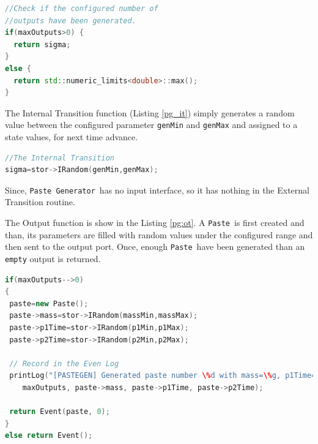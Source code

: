 \documentclass[titlepage]{report}%
\newcommand{\pgen}{\texttt{Paste Generator}~}
\newcommand{\paste}{\texttt{Paste}~}
\begin{document}
{\begin{lstlisting}[caption={The TA (Time Advance) function}, language=c++, label={pg_ta}]
//Check if the configured number of
//outputs have been generated.
if(maxOutputs>0) {
  return sigma;
}
else {
  return std::numeric_limits<double>::max();
}
\end{lstlisting}	

The Internal Transition function (Listing \ref{pg_it}) simply generates a random value between the configured parameter \texttt{genMin} and \texttt{genMax} and assigned to a state values, for next time advance.

\begin{lstlisting}[caption={The Internal Transition function for the \pgen}, language=c++, label={pg_it}]
//The Internal Transition
sigma=stor->IRandom(genMin,genMax);
\end{lstlisting}

Since, \pgen has no input interface, so it has nothing in the External Transition routine.

The Output function is show in the Listing \ref{pg:ot}. A \paste is first created and than, its parameters are filled with random values under the configured range and then sent to the output port. Once, enough \paste have been generated than an \texttt{empty} output is returned.
 
\begin{lstlisting}[caption={The Output function for the \pgen}, language=c++, label={pg:ot}]
if(maxOutputs-->0)
{
 paste=new Paste();
 paste->mass=stor->IRandom(massMin,massMax);
 paste->p1Time=stor->IRandom(p1Min,p1Max);
 paste->p2Time=stor->IRandom(p2Min,p2Max);

 // Record in the Even Log
 printLog("[PASTEGEN] Generated paste number \%d with mass=\%g, p1Time=\%g, p2Time=\%g\n",
	maxOutputs, paste->mass, paste->p1Time, paste->p2Time);

 return Event(paste, 0);
}
else return Event();

\end{lstlisting}


}
\end{document}
